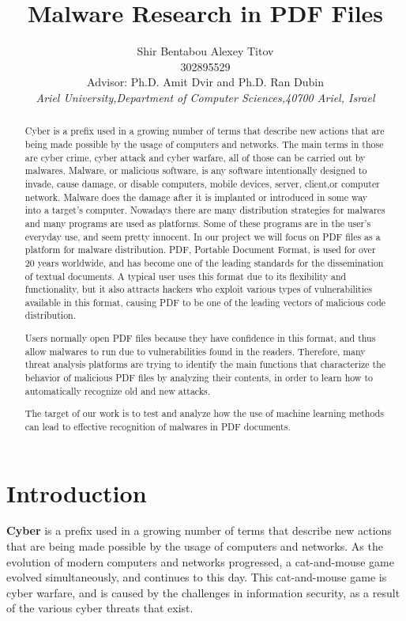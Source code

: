 \documentclass{article}
\title{Malware Research in PDF Files}
\author{Shir Bentabou \qquad Alexey Titov\\
		{\small 302895529 \quad \qquad \qquad 334063021 }\\
		{\normalsize Advisor: Ph.D. Amit Dvir and Ph.D. Ran Dubin}\\
		{\small{\textit{Ariel University,Department of Computer Sciences,40700 Ariel, Israel}}}}
\date{}
\begin{document}
\renewcommand{\thepage}{\arabic{page}}%
\pagecolor{yellow!20}
\maketitle
\begin{abstract}
		Cyber is a prefix used in a growing number of terms that describe new 
		actions that are being made possible by the usage of computers and networks.
		The main terms in those are cyber crime, cyber attack and cyber warfare, 
		all of those can be carried out by malwares.\newline
		\indent Malware, or malicious software, is any software intentionally designed to invade, 
		cause damage, or disable computers, mobile devices, server, client,or computer 
		network. Malware does the damage after it is implanted or introduced in some way 
		into a target’s computer. Nowadays there are many distribution strategies for malwares 
		and many programs  are used as platforms. Some of these programs are in the user's 
		everyday use, and seem pretty innocent. In our project we will focus on PDF 
		files as a platform for malware distribution.\newline
		\indent PDF, Portable Document Format, is used for over 20 years worldwide, and has become 
		one of the leading standards for the dissemination of textual documents. A typical user uses this format due to its flexibility and functionality,
		but it also attracts hackers who exploit various types of 
		vulnerabilities available in this format, causing PDF to be one of the leading vectors of malicious code 
		distribution. 
		
		
		\indent Users normally open PDF files because they have confidence in this format, and thus allow malwares to run due to vulnerabilities found in the readers.
		Therefore,  many threat analysis platforms are trying to identify the main functions that characterize the behavior of malicious PDF files by analyzing their contents, in order to learn how to automatically recognize old and new attacks.
		
		\indent The target of our work is to test and analyze how the use of machine learning methods  can lead to effective recognition of malwares in PDF documents.
\end{abstract}
\newpage
\section{Introduction}
\indent \textbf{Cyber} is a prefix used in a growing number of terms that describe new actions that are being made possible by the usage of computers and networks. As the evolution of modern computers and networks progressed, a cat-and-mouse game evolved simultaneously, and continues to this day. This cat-and-mouse game is cyber warfare, and is caused by the challenges in information security, as a result of the various cyber threats that exist.
\end{document}
